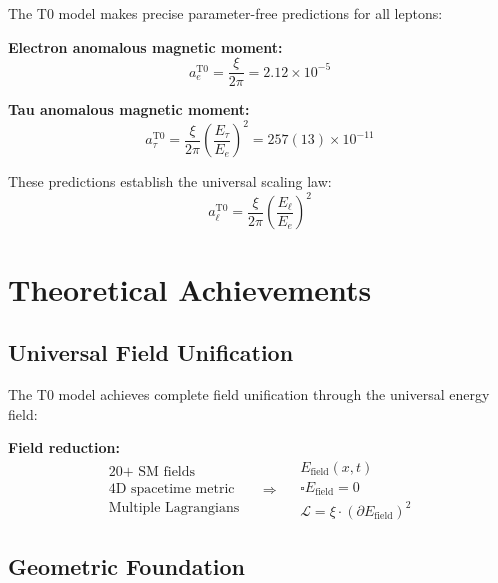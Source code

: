 \documentclass[12pt,a4paper]{report}
\begin{document}
The T0 model makes precise parameter-free predictions for all leptons:

\textbf{Electron anomalous magnetic moment:}
\begin{equation}
	a_e^{\text{T0}} = \frac{\xi}{2\pi} = 2.12 \times 10^{-5}
\end{equation}

\textbf{Tau anomalous magnetic moment:}
\begin{equation}
	a_\tau^{\text{T0}} = \frac{\xi}{2\pi} \left(\frac{E_\tau}{E_e}\right)^2 = 257(13) \times 10^{-11}
\end{equation}

These predictions establish the universal scaling law:
\begin{equation}
	a_\ell^{\text{T0}} = \frac{\xi}{2\pi} \left(\frac{E_\ell}{E_e}\right)^2
\end{equation}

\section{Theoretical Achievements}
\label{sec:theoretical_achievements}

\subsection{Universal Field Unification}
\label{subsec:universal_field_unification}

The T0 model achieves complete field unification through the universal energy field:

\textbf{Field reduction:}
\begin{equation}
	\begin{array}{c}
		\text{20+ SM fields} \\
		\text{4D spacetime metric} \\
		\text{Multiple Lagrangians}
	\end{array} \quad \Rightarrow \quad
	\begin{array}{c}
		E_{\text{field}}(x,t) \\
		\square E_{\text{field}} = 0 \\
		\mathcal{L} = \xi \cdot (\partial E_{\text{field}})^2
	\end{array}
\end{equation}

\subsection{Geometric Foundation}
\label{subsec:geometric_foundation}
\end{document}
